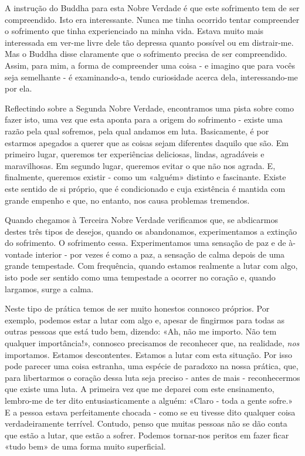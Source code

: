 A instrução do Buddha para esta Nobre Verdade é que este sofrimento tem
de ser compreendido. Isto era interessante. Nunca me tinha ocorrido
tentar compreender o sofrimento que tinha experienciado na minha vida.
Estava muito mais interessada em ver-me livre dele tão depressa quanto
possível ou em distrair-me. Mas o Buddha disse claramente que o
sofrimento precisa de ser compreendido. Assim, para mim, a forma de
compreender uma coisa - e imagino que para vocês seja semelhante - é
examinando-a, tendo curiosidade acerca dela, interessando-me por ela.

Reflectindo sobre a Segunda Nobre Verdade, encontramos uma pista sobre
como fazer isto, uma vez que esta aponta para a origem do sofrimento -
existe uma razão pela qual sofremos, pela qual andamos em luta.
Basicamente, é por estarmos apegados a querer que as coisas sejam
diferentes daquilo que são. Em primeiro lugar, queremos ter experiências
deliciosas, lindas, agradáveis e maravilhosas. Em segundo lugar,
queremos evitar o que não nos agrada. E, finalmente, queremos existir -
como um «alguém» distinto e fascinante. Existe este sentido de si
próprio, que é condicionado e cuja existência é mantida com grande
empenho e que, no entanto, nos causa problemas tremendos.

Quando chegamos à Terceira Nobre Verdade verificamos que, se abdicarmos
destes três tipos de desejos, quando os abandonamos, experimentamos a
extinção do sofrimento. O sofrimento cessa. Experimentamos uma sensação
de paz e de à-vontade interior - por vezes é como a paz, a sensação de
calma depois de uma grande tempestade. Com frequência, quando estamos
realmente a lutar com algo, isto pode ser sentido como uma tempestade a
ocorrer no coração e, quando largamos, surge a calma.

Neste tipo de prática temos de ser muito honestos connosco próprios. Por
exemplo, podemos estar a lutar com algo e, apesar de fingirmos para
todas as outras pessoas que está tudo bem, dizendo: «Ah, não me importo.
Não tem qualquer importância!», connosco precisamos de reconhecer que,
na realidade, \emph{nos} importamos. Estamos descontentes. Estamos a
lutar com esta situação. Por isso pode parecer uma coisa estranha, uma
espécie de paradoxo na nossa prática, que, para libertarmos o coração
dessa luta seja preciso - antes de mais - reconhecermos que existe uma
luta. A primeira vez que me deparei com este ensinamento, lembro-me de
ter dito entusiasticamente a alguém: «Claro - toda a gente sofre.» E a
pessoa estava perfeitamente chocada - como se eu tivesse dito qualquer
coisa verdadeiramente terrível. Contudo, penso que muitas pessoas não se
dão conta que estão a lutar, que estão a sofrer. Podemos tornar-nos
peritos em fazer ficar «tudo bem» de uma forma muito superficial.

